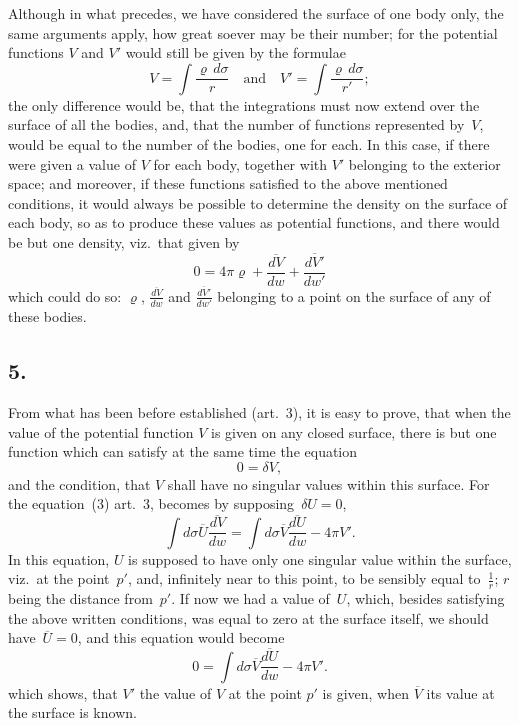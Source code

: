 \documentclass[11pt,notitlepage]{amsart}
\newcommand\Section[1]{\subsection{{#1}}}
\renewcommand{\rho}{\varrho}
\begin{document}
Although in what precedes, we have considered the surface of one
body only, the same arguments apply, how great soever may be their number;
for the potential functions $V$ and $V'$ would still be given by the formulae
\[
V=\int\frac{\rho\,d\sigma}{r}
\quad\text{and}\quad
V'=\int\frac{\rho\,d\sigma}{r'};
\]
the only difference would be, that the integrations must now extend over the
surface of all the bodies, and, that the number of functions
represented by~$V$,
would be equal to the number of the bodies, one for each. In this case, if
there were given a value of $V$ for each body,
together with $V'$ belonging
to the exterior space; and moreover, if these functions satisfied to the above
mentioned conditions, it would always be possible to determine the density
on the surface of each body, so as to produce these values as potential
functions, and there would be but one density, viz.\ that given by
\[
\tag{4'.}
0=4\pi\rho+\frac{\overline{dV}}{dw}+\frac{\overline{dV'}}{dw'}
\]
which could do so:
$\rho$, $\frac{\overline{dV}}{dw}$ and $\frac{\overline{dV'}}{dw'}$
belonging to a point on the surface of
any of these bodies.
\bigskip

\Section{5.}
From what has been before established (art.~3), it is easy to prove,
that when the value of the potential function $V$ is given on any closed 
surface, there is but one function
which can satisfy at the same time the equation
\[
0=\delta V,
\]
and the condition, that $V$ shall have no singular values within this surface.
For the equation~(3) art.~3, becomes by supposing~$\delta U=0$,
\[
\int d\sigma\overline{U}\frac{\overline{dV}}{dw}
=\int d\sigma\overline{V}\frac{\overline{dU}}{dw}-4\pi V'.
\]
In this equation, $U$ is supposed to have only one singular value within the
surface, viz.\ at the point~$p'$, and,
infinitely near to this point, to be sensibly
equal to~$\frac1r$; $r$ being the distance from~$p'$.
If now we had a value of~$U$,
which, besides satisfying the above written conditions, was equal to zero at
the surface itself, we should have~$\overline{U}=0$,
and this equation would become
\[
\tag{5.}
0=\int d\sigma\overline{V}\frac{\overline{dU}}{dw}-4\pi V'.
\]
which shows, that $V'$ the value of $V$ at the point $p'$ is given,
when $\overline{V}$ its
value at the surface is known.
\end{document}
